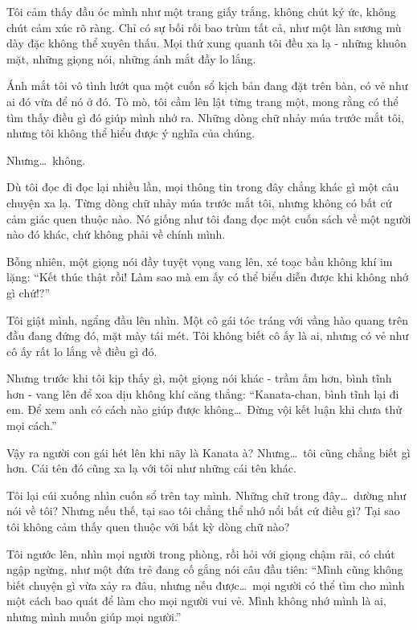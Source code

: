 \documentclass[../main.tex]{subfiles}
\begin{document}
Tôi cảm thấy đầu óc mình như một trang giấy trắng, không chút ký ức, không chút cảm xúc rõ ràng. Chỉ có sự bối rối bao trùm tất cả, như một làn sương mù dày đặc không thể xuyên thấu. Mọi thứ xung quanh tôi đều xa lạ - những khuôn mặt, những giọng nói, những ánh mắt đầy lo lắng.

Ánh mắt tôi vô tình lướt qua một cuốn sổ kịch bản đang đặt trên bàn, có vẻ như ai đó vừa để nó ở đó. Tò mò, tôi cầm lên lật từng trang một, mong rằng có thể tìm thấy điều gì đó giúp mình nhớ ra. Những dòng chữ nhảy múa trước mắt tôi, nhưng tôi không thể hiểu được ý nghĩa của chúng.

Nhưng\dots\ không.

Dù tôi đọc đi đọc lại nhiều lần, mọi thông tin trong đây chẳng khác gì một câu chuyện xa lạ. Từng dòng chữ nhảy múa trước mắt tôi, nhưng không có bất cứ cảm giác quen thuộc nào. Nó giống như tôi đang đọc một cuốn sách về một người nào đó khác, chứ không phải về chính mình.


Bỗng nhiên, một giọng nói đầy tuyệt vọng vang lên, xé toạc bầu không khí im lặng: ``Kết thúc thật rồi! Làm sao mà em ấy có thể biểu diễn được khi không nhớ gì chứ!?''

Tôi giật mình, ngẩng đầu lên nhìn. Một cô gái tóc tráng với vầng hào quang trên đầu đang đứng đó, mặt mày tái mét. Tôi không biết cô ấy là ai, nhưng có vẻ như cô ấy rất lo lắng về điều gì đó.

Nhưng trước khi tôi kịp thấy gì, một giọng nói khác - trầm ấm hơn, bình tĩnh hơn - vang lên để xoa dịu không khí căng thẳng: ``Kanata-chan, bình tĩnh lại đi em. Để xem anh có cách nào giúp được không\dots\ Đừng vội kết luận khi chưa thử mọi cách.''

Vậy ra người con gái hét lên khi nãy là Kanata à? Nhưng\dots\ tôi cũng chẳng biết gì hơn. Cái tên đó cũng xa lạ với tôi như những cái tên khác.

Tôi lại cúi xuống nhìn cuốn sổ trên tay mình. Những chữ trong đây\dots\ dường như nói về tôi? Nhưng nếu thế, tại sao tôi chẳng thể nhớ nổi bất cứ điều gì? Tại sao tôi không cảm thấy quen thuộc với bất kỳ dòng chữ nào?

Tôi ngước lên, nhìn mọi người trong phòng, rồi hỏi với giọng chậm rãi, có chút ngập ngừng, như một đứa trẻ đang cố gắng nói câu đầu tiên: ``Mình cũng không biết chuyện gì vừa xảy ra đâu, nhưng nếu được\dots\ mọi người có thể tìm cho mình một cách bao quát để làm cho mọi người vui vẻ. Mình không nhớ mình là ai, nhưng mình muốn giúp mọi người.''
\end{document}
